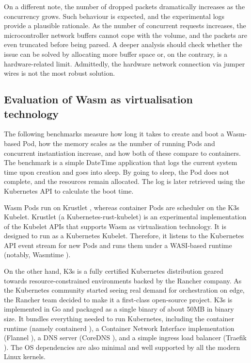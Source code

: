 On a different note, the number of dropped packets dramatically increases as the concurrency grows. Such behaviour is expected, and the experimental logs provide a plausible rationale. As the number of concurrent requests increases, the microcontroller network buffers cannot cope with the volume, and the packets are even truncated before being parsed. A deeper analysis should check whether the issue can be solved by allocating more buffer space or, on the contrary, is a hardware-related limit. Admittedly, the hardware network connection via jumper wires is not the most robust solution.

\subsection{Evaluation of Wasm as virtualisation technology}

The following benchmarks measure how long it takes to create and boot a Wasm-based Pod, how the memory scales as the number of running Pods and concurrent instantiation increase, and how both of these compare to containers. The benchmark is a simple DateTime application that logs the current system time upon creation and goes into sleep. By going to sleep, the Pod does not complete, and the resources remain allocated. The log is later retrieved using the Kubernetes API to calculate the boot time. 

Wasm Pods run on Krustlet \cite{krustlet}, whereas container Pods are scheduler on the K3s \cite{k3s} Kubelet. Krustlet (a Kubernetes-rust-kubelet) is an experimental implementation of the Kubelet APIs that supports Wasm as virtualisation technology. It is designed to run as a Kubernetes Kubelet. Therefore, it listens to the Kubernetes API event stream for new Pods and runs them under a WASI-based runtime (notably, Wasmtime \cite{wasmtime}).

On the other hand, K3s is a fully certified Kubernetes distribution geared towards resource-constrained environments backed by the Rancher company. As the Kubernetes community started seeing real demand for orchestration on edge, the Rancher team decided to make it a first-class open-source project. K3s is implemented in Go and packaged as a single binary of about 50MB in binary size. It bundles everything needed to run Kubernetes, including the container runtime (namely containerd \cite{containerd}), a Container Network Interface implementation (Flannel \cite{flannel}), a DNS server (CoreDNS \cite{coredns}), and a simple ingress load balancer (Traefik \cite{traefik}). The OS dependencies are also minimal and well supported by all the modern Linux kernels.

